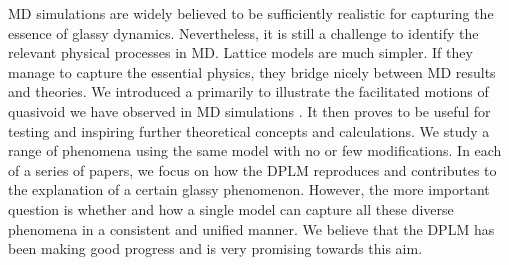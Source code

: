 \documentclass[aps,rmp,tighten,twocolumn,floatfix,a4paper,longbibliography]{revtex4-1}
\begin{document}

MD simulations are widely believed to be sufficiently realistic for capturing the essence of glassy dynamics. Nevertheless, it is still a challenge to identify the relevant physical processes in MD. Lattice models are much simpler. If they manage to capture the essential physics, they bridge nicely between MD results and theories.
We introduced a  primarily to illustrate the facilitated motions of quasivoid we have observed in MD simulations \cite{zhang2017}. It then proves to be useful for testing and inspiring further theoretical concepts and calculations. 
We study a range of phenomena using the same model with no or few modifications.
In each of a series of papers, we focus on how the DPLM reproduces and contributes to the explanation of a certain glassy phenomenon. However, the more important question is whether and how a single model can capture all these diverse phenomena in a consistent and unified manner. We believe that the DPLM has been making good progress and is very promising towards this aim. 
\end{document}
